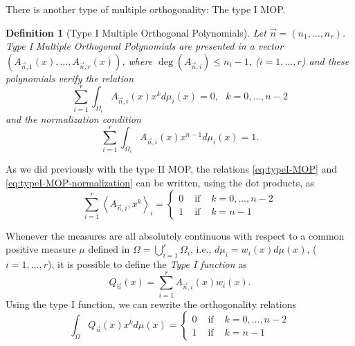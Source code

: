 \documentclass[12pt,a4]{article}
\theoremstyle{plain}
\newtheorem{definition}[theorem]{Definition}
\newcommand{\prodesc}[2]{\left\langle #1 , #2 \right\rangle}
\begin{document}
There is another type of multiple orthogonality: The type I MOP.

\begin{definition}[Type I Multiple Orthogonal Polynomials]
    Let $\vec n = (n_1,\dots,n_r)$. Type I Multiple Orthogonal Polynomials are presented in a vector $(A_{\vec n, 1}(x), \dots, A_{\vec n, r}(x))$, where $\deg(A_{\vec n, i})\leq n_i-1$, ($i=1,\dots,r$) and these polynomials verify the relation
    \begin{equation}
        \label{eq:typeI-MOP}
        \sum_{i=1}^r \int_{\Omega_i}A_{\vec n, i}(x) x^k d\mu_i(x) = 0,  \ \ \ k=0,\dots,n-2
    \end{equation}
    and the normalization condition
    \begin{equation}
        \label{eq:typeI-MOP-normalization}
        \sum_{i=1}^r \int_{\Omega_i}A_{\vec n, i}(x) x^{n-1} d\mu_i(x) = 1.
    \end{equation}
    
\end{definition}

As we did previously with the type II MOP, the relations \eqref{eq:typeI-MOP} and \eqref{eq:typeI-MOP-normalization} can be written, using the dot products, as
\begin{equation}
    \sum_{i=1}^r \prodesc{A_{\vec n,i}}{x^k}_i = \left\{\begin{array}{ccl}
        0 &   \text{ if } & k=0,\dots,n-2 \\
        1 & \text{ if } & k=n-1      
    \end{array}\right.
\end{equation}

Whenever the measures are all absolutely continuous with respect to a common positive measure $\mu$ defined in $\Omega = \displaystyle\bigcup_{i=1}^r \Omega_i$, i.e., $d\mu_i = w_i(x) d\mu(x)$, ($i=1,\dots,r$), it is possible to define the \textit{Type I function} as
\begin{equation}
    \label{eq:typeI-function}
    Q_{\vec n}(x)=\sum_{i=1}^r A_{\vec n,i}(x)w_i(x).
\end{equation}
Using the type I function, we can rewrite the orthogonality relations
\begin{equation}
    \int_\Omega Q_{\vec n}(x) x^k d\mu(x) = \left\{\begin{array}{ccl}
        0 &   \text{ if } & k=0,\dots,n-2 \\
        1 & \text{ if } & k=n-1      
    \end{array}\right.
\end{equation}
\end{document}
